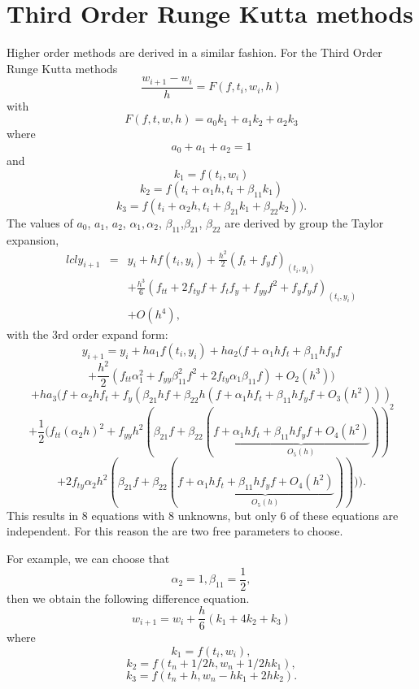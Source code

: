 \section{Third Order Runge Kutta methods}
Higher order methods are derived in a similar fashion.
For the Third Order Runge Kutta methods 
\begin{equation}
\frac{w_{i+1}-w_i}{h}=F(f,t_i,w_i,h)
\end{equation}
with
\begin{equation}
F(f,t,w,h)=a_0k_1+a_1k_2+a_2k_3
\end{equation}
where 
\[a_0+a_1+a_2=1\] 
and
\[k_1=f(t_i,w_i)\]
\[k_2=f(t_i+\alpha_1h,t_i+\beta_{11}k_1)\]
\[k_3=f(t_i+\alpha_2h,t_i+\beta_{21}k_1+\beta_{22}k_2)).\]
The values of $a_0$, $a_1$, $a_2$, $\alpha_1,\alpha_2$, $\beta_{11}$,$\beta_{21}$, $\beta_{22}$ are derived by group the Taylor expansion,
\begin{eqnarray}{lcl} y_{i+1}&=&y_{i}+hf(t_{i},y_{i})+{\frac {h^{2}}{2}}(f_{t}+f_{y}f)_{(t_{i},y_{i})}\\
& &+{\frac {h^{3}}{6}}\left(f_{tt}+2f_{ty}f+f_{t}f_{y}+f_{yy}f^{2}+f_{y}f_{y}f\right)_{(t_{i},y_{i})}\\
& &+O(h^{4}),\end{eqnarray}
with the 3rd order expand form:
\[ y_{i+1}=y_{i}+ha_{1}f(t_{i},y_{i})+ha_{2}(f+\alpha_{1}hf_{t}+\beta_{11}hf_{y}f\]\[+{\frac {h^{2}}{2}}(f_{tt}\alpha_{1}^{2}+f_{yy}\beta_{11}^{2}f^{2}+2f_{ty}\alpha_{1}\beta_{11}f)+O_{2}(h^{3}))\]
\[+ha_{3}(f+\alpha_{2}hf_{t}+f_{y}\left(\beta_{21}hf+\beta_{22}h(f+\alpha_{1}hf_{t}+\beta_{11}hf_{y}f+O_{3}(h^{2}))\right)\] 
\[+{\frac {1}{2}}(f_{tt}(\alpha_{2}h)^{2}+f_{yy}h^{2}(\beta_{21}f+ \beta_{22}(f+\underbrace {\alpha_{1}hf_{t}+\beta_{11}hf_{y}f+O_{4}(h^{2})} _{O_{5}(h)}))^{2}\]
 \[+2f_{ty}\alpha_{2}h^{2}(\beta_{21}f+\beta_{22}(f+\underbrace {\alpha_{1}hf_{t}+\beta_{11}hf_{y}f+O_{4}(h^{2})} _{O_{5}(h)})))).\]
 This results in 8 equations with 8 unknowns, but only 6 of these equations are independent. For this reason the are two free parameters to choose.

For example, we can choose that \[\alpha_{2}=1,\beta_{11}=\frac{1}{2},\]then we obtain the following difference equation.
\[ w_{i+1}=w_{i}+{\frac {h}{6}}(k_{1}+4k_{2}+k_{3})\]
where
\[k_{1}=f(t_{i},w_{i}),\]
\[ k_{2}=f(t_{n}+1/2h,w_{n}+1/2hk_{1}),\]
\[ k_{3}=f(t_{n}+h,w_{n}-hk_{1}+2hk_{2}).\]


